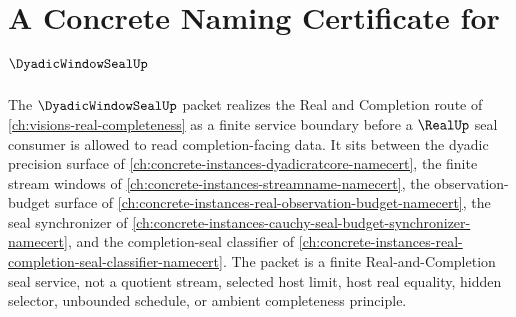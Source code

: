 \chapter{A Concrete Naming Certificate for $\DyadicWindowSealUp$}
\label{ch:concrete-instances-dyadic-window-seal-namecert}

The $\DyadicWindowSealUp$ packet realizes the Real and Completion route of \autoref{ch:visions-real-completeness} as a finite service boundary before a $\RealUp$ seal consumer is allowed to read completion-facing data. It sits between the dyadic precision surface of \autoref{ch:concrete-instances-dyadicratcore-namecert}, the finite stream windows of \autoref{ch:concrete-instances-streamname-namecert}, the observation-budget surface of \autoref{ch:concrete-instances-real-observation-budget-namecert}, the seal synchronizer of \autoref{ch:concrete-instances-cauchy-seal-budget-synchronizer-namecert}, and the completion-seal classifier of \autoref{ch:concrete-instances-real-completion-seal-classifier-namecert}. The packet is a finite Real-and-Completion seal service, not a quotient stream, selected host limit, host real equality, hidden selector, unbounded schedule, or ambient completeness principle.

